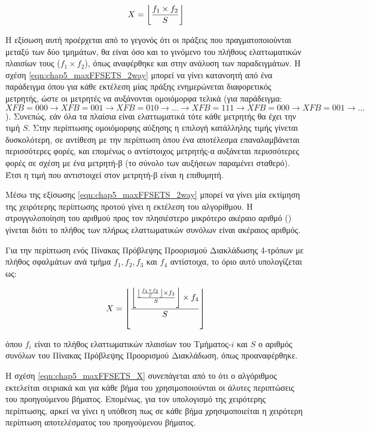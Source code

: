 \begin{equation}
    \label{eqn:chap5_maxFFSETS_2way}
    X = \floor*{ \frac{f_1 \times f_2}{S} }
\end{equation}

Η εξίσωση αυτή προέρχεται από το γεγονός ότι οι πράξεις \xor που πραγματοποιούνται μεταξύ των δύο τμημάτων, θα είναι όσο και το γινόμενο του πλήθους ελαττωματικών πλαισίων τους ($f_1 \times f_2$), όπως αναφέρθηκε και στην ανάλυση των παραδειγμάτων. Η σχέση \ref{eqn:chap5_maxFFSETS_2way} μπορεί να γίνει κατανοητή από ένα παράδειγμα όπου για κάθε εκτέλεση μίας πράξης \xor ενημερώνεται διαφορετικός μετρητής, ώστε οι μετρητές να αυξάνονται ομοιόμορφα τελικά (για παράδειγμα: $XFB=000 \rightarrow XFB=001 \rightarrow XFB=010 \rightarrow ... \rightarrow XFB=111 \rightarrow XFB=000 \rightarrow XFB=001 \rightarrow ... $). Συνεπώς, εάν όλα τα πλαίσια είναι ελαττωματικά τότε κάθε μετρητής θα έχει την τιμή $S$. Στην περίπτωσης ομοιόμορφης αύξησης η επιλογή κατάλληλης τιμής γίνεται δυσκολότερη, σε αντίθεση με την περίπτωση όπου ένα αποτέλεσμα επαναλαμβάνεται περισσότερες φορές, και επομένως ο αντίστοιχος μετρητής-α αυξάνεται περισσότερες φορές σε σχέση με ένα μετρητή-β (το σύνολο των αυξήσεων παραμένει σταθερό). Έτσι η τιμή που αντιστοιχεί στον μετρητή-β είναι η επιθυμητή.
\par
Μέσω της εξίσωσης \ref{eqn:chap5_maxFFSETS_2way} μπορεί να γίνει μία εκτίμηση της χειρότερης περίπτωσης προτού γίνει η εκτέλεση του αλγορίθμου. Η στρογγυλοποίηση του αριθμού προς τον πλησιέστερο μικρότερο ακέραιο αριθμό () γίνεται διότι το πλήθος των πλήρως ελαττωματικών συνόλων είναι ακέραιος αριθμός.
\par
Για την περίπτωση ενός Πίνακας Πρόβλεψης Προορισμού Διακλάδωσης 4-τρόπων με πλήθος σφαλμάτων ανά τμήμα $f_1, f_2, f_3$ και $f_4$ αντίστοιχα, το όριο αυτό υπολογίζεται ως:

\begin{equation}
    \label{eqn:chap5_maxFFSETS_X}
    X = \floor*{ \frac{ \floor*{ \frac{ \floor*{ \frac{f_1 \times f_2}{S} } \times f_3}{S} } \times f_4}{S} }
\end{equation}

\noindent όπου $f_i$ είναι το πλήθος ελαττωματικών πλαισίων του Τμήματος-$i$ και $S$ ο αριθμός συνόλων του Πίνακας Πρόβλεψης Προορισμού Διακλάδωση, όπως προαναφέρθηκε.
\par
Η σχέση \ref{eqn:chap5_maxFFSETS_X} συνεπάγεται από το ότι ο αλγόριθμος εκτελείται σειριακά και για κάθε βήμα του χρησιμοποιούνται οι άλυτες περιπτώσεις του προηγούμενου βήματος. Επομένως, για τον υπολογισμό της χειρότερης περίπτωσης, αρκεί να γίνει η υπόθεση πως σε κάθε βήμα χρησιμοποιείται η χειρότερη περίπτωση αποτελέσματος του προηγούμενου βήματος.


